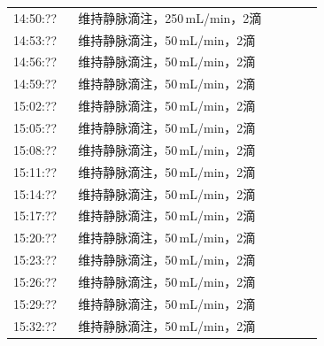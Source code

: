 \documentclass[UTF8,10pt,a4paper,fontset=fandol]{ctexart}
\newcommand{\fieldvalue}[1]{#1}
\begin{document}
\begin{tabular}{p{0.18\linewidth}p{0.68\linewidth}}
14:50:?? & \fieldvalue{维持静脉滴注，250\,mL/min，2滴} \\[2pt]
14:53:?? & \fieldvalue{维持静脉滴注，50\,mL/min，2滴} \\[2pt]
14:56:?? & \fieldvalue{维持静脉滴注，50\,mL/min，2滴} \\[2pt]
14:59:?? & \fieldvalue{维持静脉滴注，50\,mL/min，2滴} \\[2pt]
15:02:?? & \fieldvalue{维持静脉滴注，50\,mL/min，2滴} \\[2pt]
15:05:?? & \fieldvalue{维持静脉滴注，50\,mL/min，2滴} \\[2pt]
15:08:?? & \fieldvalue{维持静脉滴注，50\,mL/min，2滴} \\[2pt]
15:11:?? & \fieldvalue{维持静脉滴注，50\,mL/min，2滴} \\[2pt]
15:14:?? & \fieldvalue{维持静脉滴注，50\,mL/min，2滴} \\[2pt]
15:17:?? & \fieldvalue{维持静脉滴注，50\,mL/min，2滴} \\[2pt]
15:20:?? & \fieldvalue{维持静脉滴注，50\,mL/min，2滴} \\[2pt]
15:23:?? & \fieldvalue{维持静脉滴注，50\,mL/min，2滴} \\[2pt]
15:26:?? & \fieldvalue{维持静脉滴注，50\,mL/min，2滴} \\[2pt]
15:29:?? & \fieldvalue{维持静脉滴注，50\,mL/min，2滴} \\[2pt]
15:32:?? & \fieldvalue{维持静脉滴注，50\,mL/min，2滴} \\
\end{tabular}

\vspace{1em}
\end{document}
